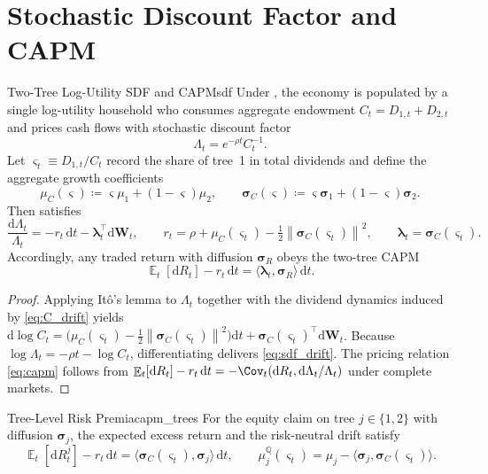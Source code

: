 ﻿\documentclass[11pt,letterpaper,oneside]{article}
\numberwithin{equation}{section}
\DeclareMathOperator{\E}{\mathbb{E}}
\newcommand{\1}{\mathbf{1}}
\newcommand{\diff}{\mathrm{d}}
\newcommand{\ip}[2]{\langle #1,#2\rangle}
\newcommand{\norm}[1]{\left\lVert #1\right\rVert}
\begin{document}
\section{Stochastic Discount Factor and CAPM}\label{sec:sdf}

\begin{proposition}{Two-Tree Log-Utility SDF and CAPM}{sdf}
Under , the economy is populated by a single log-utility household who consumes aggregate endowment $C_t=D_{1,t}+D_{2,t}$ and prices cash flows with stochastic discount factor
\begin{equation}\label{eq:sdf}
  \Lambda_t = e^{-\rho t} C_t^{-1}.
\end{equation}
Let $\varsigma_t \equiv D_{1,t}/C_t$ record the share of tree~1 in total dividends and define the aggregate growth coefficients
\begin{equation}\label{eq:agg_coeffs}
  \mu_C(\varsigma) \coloneqq \varsigma\mu_1 + (1-\varsigma)\mu_2,
  \qquad
  \bm{\sigma}_C(\varsigma) \coloneqq \varsigma\bm{\sigma}_1 + (1-\varsigma)\bm{\sigma}_2.
\end{equation}
Then \Lambda satisfies
\begin{equation}\label{eq:sdf_drift}
  \frac{\diff \Lambda_t}{\Lambda_t}
  = -r_t\,\diff t - \bm{\lambda}_t^{\top}\diff \bm{W}_t,
  \qquad
  r_t = \rho + \mu_C(\varsigma_t) - \tfrac12\norm{\bm{\sigma}_C(\varsigma_t)}^2,
  \qquad
  \bm{\lambda}_t = \bm{\sigma}_C(\varsigma_t).
\end{equation}
Accordingly, any traded return with diffusion $\bm{\sigma}_R$ obeys the two-tree CAPM
\begin{equation}\label{eq:capm}
  \E_t[\diff R_t] - r_t\,\diff t = \ip{\bm{\lambda}_t}{\bm{\sigma}_R}\,\diff t.
\end{equation}
\end{proposition}
\begin{proof}
Applying It\^o's lemma to $\Lambda_t$ together with the dividend dynamics induced by \eqref{eq:C_drift} yields $\diff \log C_t = \big(\mu_C(\varsigma_t)-\tfrac12\norm{\bm{\sigma}_C(\varsigma_t)}^2\big)\diff t + \bm{\sigma}_C(\varsigma_t)^{\top}\diff \bm{W}_t$.
Because $\log \Lambda_t=-\rho t-\log C_t$, differentiating delivers \eqref{eq:sdf_drift}.
The pricing relation \eqref{eq:capm} follows from $\E_t[\diff R_t] - r_t\,\diff t = -\Cov_t(\diff R_t, \diff \Lambda_t/\Lambda_t)$ under complete markets.
\end{proof}
\begin{corollary}{Tree-Level Risk Premia}{capm_trees}
For the equity claim on tree $j\in\{1,2\}$ with diffusion $\bm{\sigma}_j$, the expected excess return and the risk-neutral drift satisfy
\begin{equation}\label{eq:tree_capm}
  \E_t[\diff R_t^j] - r_t\,\diff t = \ip{\bm{\sigma}_C(\varsigma_t)}{\bm{\sigma}_j}\,\diff t,
  \qquad
  \mu_j^{\mathbb{Q}}(\varsigma_t) = \mu_j - \ip{\bm{\sigma}_j}{\bm{\sigma}_C(\varsigma_t)}.
\end{equation}
\end{corollary}
\end{document}
